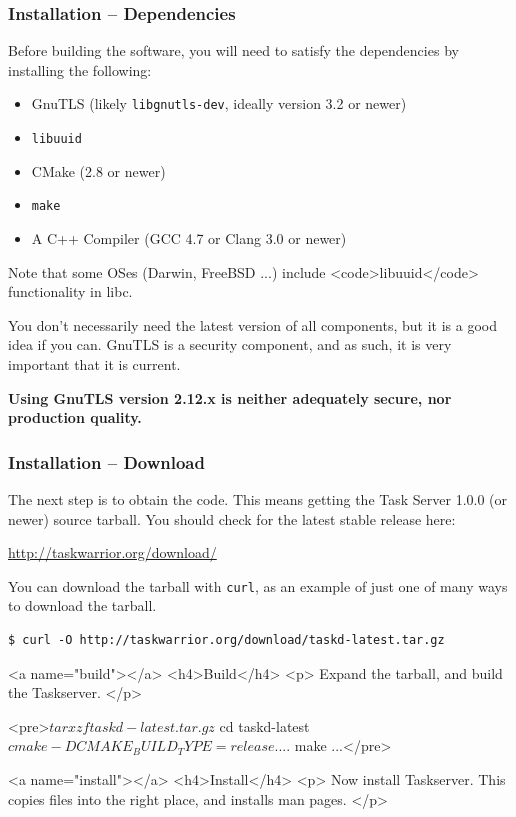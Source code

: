 \documentclass[t,handout]{beamer}
\begin{document}
\begin{frame}[fragile]\frametitle{Installation -- Dependencies}
    Before building the software, you will need to satisfy the dependencies by installing the following:

    \begin{itemize}
        \item GnuTLS (likely \verb+libgnutls-dev+, ideally version 3.2 or newer)
        \item \verb+libuuid+
        \item CMake (2.8 or newer)
        \item \verb+make+
        \item A C++ Compiler (GCC 4.7 or Clang 3.0 or newer)
    \end{itemize}

    Note that some OSes (Darwin, FreeBSD ...) include <code>libuuid</code> functionality in libc.

    You don't necessarily need the latest version of all components, but it is a good idea if you can.  GnuTLS is a security component, and as such, it is very important that it is current.

    \textbf{Using GnuTLS version 2.12.x is neither adequately secure, nor production quality.}
\end{frame}

\begin{frame}[fragile]\frametitle{Installation -- Download}
    The next step is to obtain the code. This means getting the Task Server 1.0.0 (or newer) source tarball.  You should check for the latest stable release here:

    \href{http://taskwarrior.org/download/}{http://taskwarrior.org/download/}

    \vfill
    You can download the tarball with \verb+curl+, as an example of just one of many ways to download the tarball.

    \begin{lstlisting}
$ curl -O http://taskwarrior.org/download/taskd-latest.tar.gz
    \end{lstlisting}
\end{frame}

\iffalse
<a name="build"></a>
<h4>Build</h4>
<p>
  Expand the tarball, and build the Taskserver.
</p>

<pre>$ tar xzf taskd-latest.tar.gz
$ cd taskd-latest
$ cmake -DCMAKE_BUILD_TYPE=release .
...
$ make
...</pre>

<a name="install"></a>
<h4>Install</h4>
<p>
  Now install Taskserver.  This copies files into the right place,
  and installs man pages.
</p>
\end{document}
